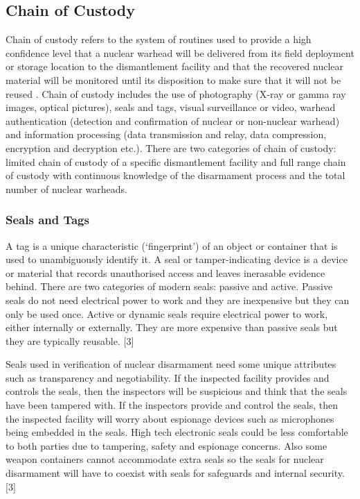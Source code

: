 \documentclass[twocolumn,a4paper]{article}
\begin{document}
\subsection{Chain of Custody}
Chain of custody refers to the system of routines used to provide a
high confidence level that a nuclear warhead will be delivered from
its field deployment or storage location to the dismantlement facility
and that the recovered nuclear material will be monitored until its
disposition to make sure that it will not be reused
\citep{zarimpas2003}. Chain of custody includes the use of photography
(X-ray or gamma ray images, optical pictures), seals and tags, visual
surveillance or video, warhead authentication (detection and
confirmation of nuclear or non-nuclear warhead) and information
processing (data transmission and relay, data compression, encryption
and decryption etc.). There are two categories of chain of custody:
limited chain of custody of a specific dismantlement facility and full
range chain of custody with continuous knowledge of the disarmament
process and the total number of nuclear warheads. \citep{wuwen2004}

\subsubsection{Seals and Tags}
A tag is a unique characteristic (`fingerprint') of an object or
container that is used to unambiguously identify it. A seal or
tamper-indicating device is a device or material that records
unauthorised access and leaves inerasable evidence behind. There are
two categories of modern seals: passive and active. Passive seals do
not need electrical power to work and they are inexpensive but they
can only be used once. Active or dynamic seals require electrical
power to work, either internally or externally. They are more
expensive than passive seals but they are typically reusable. [3]

Seals used in verification of nuclear disarmament need some unique
attributes such as transparency and negotiability. If the inspected
facility provides and controls the seals, then the inspectors will be
suspicious and think that the seals have been tampered with. If the
inspectors provide and control the seals, then the inspected facility
will worry about espionage devices such as microphones being embedded
in the seals. High tech electronic seals could be less comfortable to
both parties due to tampering, safety and espionage concerns. Also
some weapon containers cannot accommodate extra seals so the seals for
nuclear disarmament will have to coexist with seals for safeguards and
internal security. [3]
\end{document}
